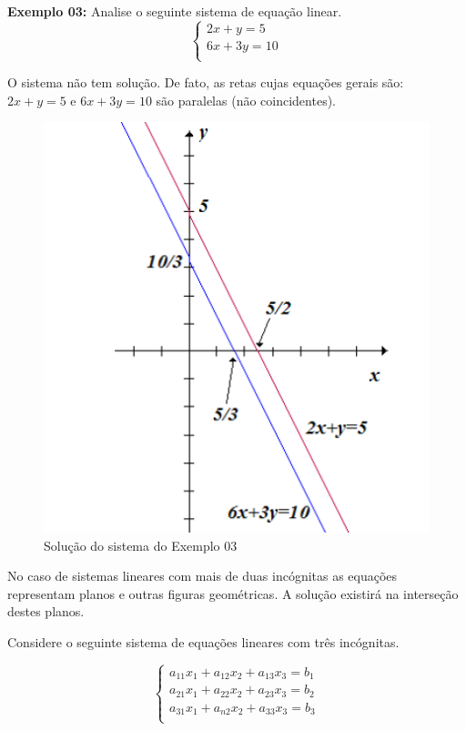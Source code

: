 \documentclass[oneside,a4paper,12pt]{article}
\begin{document}
\textbf{Exemplo 03: }
Analise o seguinte sistema de equação linear.
$$
\left\{
\begin{array}{c}
2x + y = 5 \\
6x + 3y = 10 \\
\end{array}
\right.
$$

O sistema não tem solução. De fato, as retas cujas equações gerais são: $2x+y=5$ e $6x+3y=10$ são paralelas (não coincidentes).

\begin{figure}[!h]
	\centering
	\includegraphics[scale=0.6]{s3}
	\caption{Solução do sistema do Exemplo 03}
	\label{s3}
\end{figure}


No caso de sistemas lineares com mais de duas incógnitas as equações representam planos e outras figuras geométricas. A solução existirá na interseção destes planos.

Considere o seguinte sistema de equações lineares com três incógnitas.

$$
\left\{
\begin{array}{c}
a_{11}x_1 + a_{12}x_2 + a_{13}x_3=b_1 \\
a_{21}x_1 + a_{22}x_2 + a_{23}x_3=b_2 \\
a_{31}x_1 + a_{n2}x_2 + a_{33}x_3=b_3 \\
\end{array}
\right.
$$
\end{document}
